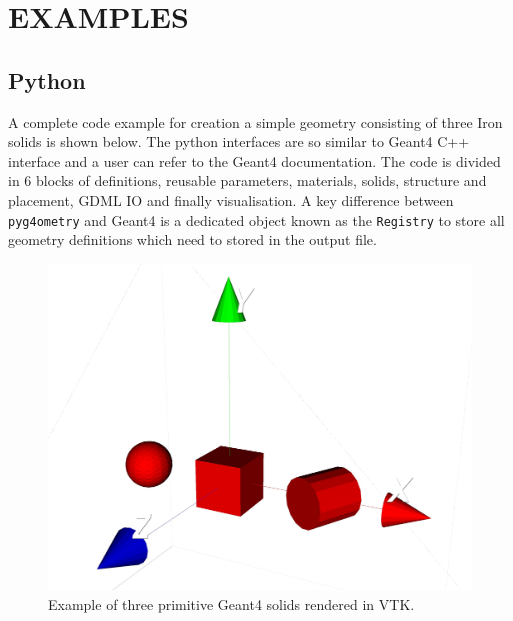 \documentclass[a4paper,
               keeplastbox,   %
               ]{jacow}
\begin{document}
\section{EXAMPLES}
\subsection{Python}
A complete code example for creation a simple geometry consisting of three Iron solids is shown below. The python interfaces are so similar to Geant4 C++ interface and a user can refer to the Geant4 documentation.  
The code is divided in 6 blocks of definitions, reusable parameters, materials, solids, structure and placement, GDML IO and finally visualisation. A key difference between \verb|pyg4ometry| and Geant4 is a dedicated object known as the \verb|Registry| to store all geometry definitions which need to stored in the output file.  
\begin{figure}[!htb]
   \centering
   \includegraphics*[width=.9\columnwidth]{./examples/simple.jpg}
   \caption{Example of three primitive Geant4 solids rendered in VTK.}
   \label{fig:simple}
\end{figure}
\end{document}
